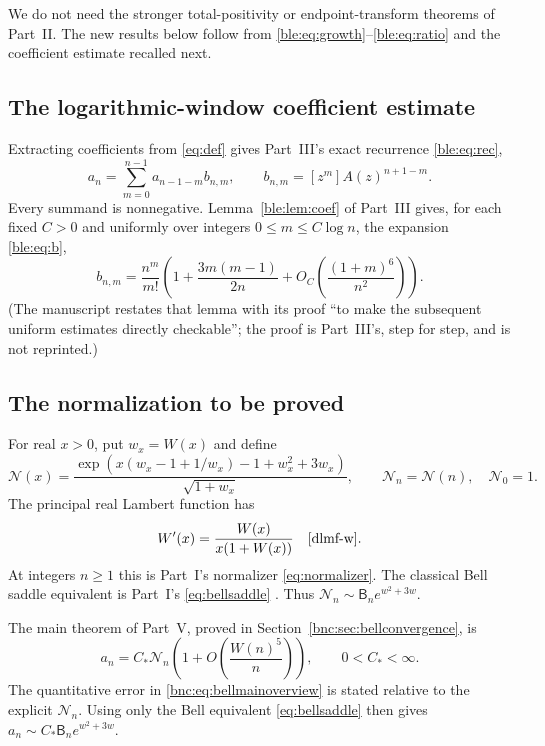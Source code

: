 \documentclass[11pt]{article}
\numberwithin{equation}{section}
\theoremstyle{definition}
\theoremstyle{remark}
\begin{document}
We do not need the stronger total-positivity or endpoint-transform
theorems of Part~II.  The new results below follow from
\eqref{ble:eq:growth}--\eqref{ble:eq:ratio} and the
coefficient estimate recalled next.

\subsection{The logarithmic-window coefficient estimate}

Extracting coefficients from \eqref{eq:def} gives Part~III's exact
recurrence \eqref{ble:eq:rec},
\[
 a_n=\sum_{m=0}^{n-1}a_{n-1-m}b_{n,m},\qquad
 b_{n,m}=[z^m]A(z)^{n+1-m}.
\]
Every summand is nonnegative. Lemma~\ref{ble:lem:coef} of Part~III gives,
for each fixed \(C>0\) and uniformly over integers \(0\le m\le C\log n\),
the expansion \eqref{ble:eq:b},
\[
 b_{n,m}=\frac{n^m}{m!}
 \left(1+\frac{3m(m-1)}{2n}
       +O_C\!\left(\frac{(1+m)^6}{n^2}\right)\right).
\]
(The manuscript restates that lemma with its proof ``to make the
subsequent uniform estimates directly checkable''; the proof is Part~III's,
step for step, and is not reprinted.)

\subsection{The normalization to be proved}

For real \(x>0\), put \(w_x=W(x)\) and define
\begin{equation}\label{bnc:eq:normalizer}
 \mathcal N(x)=
 \frac{\exp\!\left(x(w_x-1+1/w_x)-1+w_x^2+3w_x\right)}
      {\sqrt{1+w_x}},\qquad
 \mathcal N_n=\mathcal N(n),\quad \mathcal N_0=1.
\end{equation}
The principal real Lambert function has
\[
 W'(x)=\frac{W(x)}{x(1+W(x))}
 \quad\cite{dlmf-w}.
\]
At integers \(n\ge1\) this is Part~I's normalizer \eqref{eq:normalizer}.
The classical Bell saddle equivalent is Part~I's \eqref{eq:bellsaddle}
\cite{moserwyman,dlmf-bell}.
Thus \(\mathcal N_n\sim\mathsf B_ne^{w^2+3w}\).

The main theorem of Part~V, proved in
Section~\ref{bnc:sec:bellconvergence}, is
\begin{equation}\label{bnc:eq:bellmainoverview}
 \boxed{a_n=C_*\mathcal N_n
         \left(1+O\!\left(\frac{W(n)^5}{n}\right)\right),
         \qquad 0<C_*<\infty.}
\end{equation}
The quantitative error in \eqref{bnc:eq:bellmainoverview} is stated
relative to the explicit \(\mathcal N_n\).
Using only the Bell equivalent \eqref{eq:bellsaddle} then gives
\(a_n\sim C_*\mathsf B_ne^{w^2+3w}\).
\end{document}
